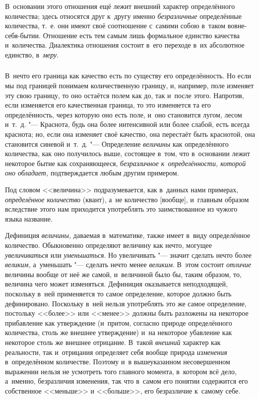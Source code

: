 В~основании этого отношения ещё лежит внешний характер определённого
количества; здесь относятся друг к~другу именно {\em безразличные}
определённые количества, т.~е. они имеют своё соотношение
с~самими собою в~таком вовне-себя-бытии.
Отношение есть тем самым лишь формальное единство качества
и~количества. Диалектика отношения состоит в~его переходе в~их абсолютное
единство, в~{\em меру}.

\subsubsection[Примечание]{}

В~нечто его граница как качество есть по существу его определённость. Но если
мы под границей понимаем количественную границу, и, например, поле изменяет эту
свою границу, то оно остаётся полем как до, так и~после этого. Напротив, если
изменяется его качественная граница, то это изменяется та его определённость,
через которую оно есть поле, и~оно становится лугом, лесом и~т.~д. "---
Краснота, будь она более интенсивной или более слабой, есть всегда краснота;
но, если она изменяет своё качество, она перестаёт быть краснотой, она
становится синевой и~т.~д. "--- Определение {\em величины} как определённого
количества, как оно получилось выше, состоящее в~том, что в~основании лежит
некоторое бытие как сохраняющееся, {\em безразличное к~определённости, которой
оно обладает,} подтверждается любым другим примером.

Под словом <<величина>> подразумевается, как в~данных нами примерах,
{\em определённое количество} (квант), а~не количество [вообще], и~главным
образом вследствие этого нам приходится употреблять это заимствованное из
чужого языка название.

Дефиниция {\em величины,} даваемая в~математике, также имеет в~виду
определённое количество. Обыкновенно определяют величину как нечто, могущее
{\em увеличиваться} или {\em уменьшаться}. Но увеличивать "--- значит сделать
нечто более {\em великим,} а~уменьшать "--- сделать нечто менее {\em великим}.
В~этом состоит {\em отличие} величины вообще от неё же самой, и~величиной было
бы, таким образом, то, величина чего может изменяться. Дефиниция оказывается
неподходящей, поскольку в~ней применяется то самое определение, которое должно
быть дефинировано. Поскольку в~ней нельзя употреблять это же самое определение,
постольку <<более>> или <<менее>> должны быть разложены на некоторое
прибавление как утверждение (и~притом, согласно природе определённого
количества, столь же внешнее утверждение) и~на некоторое убавление как
некоторое столь же внешнее отрицание. В~такой {\em внешний} характер как
реальности, так и~отрицания определяет себя вообще природа {\em изменения}
в~определённом количестве. Поэтому и~в вышеуказанном несовершенном выражении
нельзя не усмотреть того главного момента, в~котором всё дело, а~именно,
безразличия изменения, так что в~самом его понятии содержится его собственное
<<меньше>> и <<больше>>, его безразличие к~самому себе.

